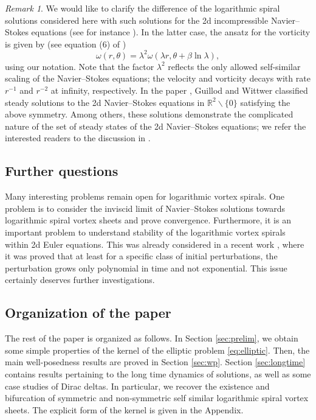 \documentclass[10pt]{article}
\theoremstyle{definition}
\theoremstyle{remark}
\newtheorem{remark}[theorem]{Remark}
\numberwithin{equation}{section}
\newcommand{\0}{\emptyset}
\newcommand{\bt}{\beta}
\newcommand{\lmb}{\lambda}
\begin{document}
\begin{remark}
    We would like to clarify the difference of the logarithmic spiral solutions considered here with such solutions for the 2d incompressible Navier--Stokes equations (see for instance \cite{GuWi,GuWi2,Sve,Hamel,Landau}). In the latter case, the ansatz for the vorticity is given by (see equation (6) of \cite{GuWi}) $$\omega(r,\theta)=\lmb^{2} \omega(\lmb r, \theta + \bt \ln \lmb), $$ using our notation. Note that the factor $\lmb^{2}$ reflects the only allowed self-similar scaling of the Navier--Stokes equations; the velocity and vorticity decays with rate $r^{-1}$ and $r^{-2}$ at infinity, respectively. In the paper \cite{GuWi}, Guillod and Wittwer classified steady solutions to the 2d Navier--Stokes equations in $\mathbb{R}^{2}\backslash \{0\}$ satisfying the above symmetry. Among others, these solutions demonstrate the complicated nature of the set of steady states of the 2d Navier--Stokes equations; we refer the interested readers to the discussion in \cite{GuWi}. 
\end{remark}


\subsection{Further questions} Many interesting problems remain open for logarithmic vortex spirals. One problem is to consider the inviscid limit of Navier--Stokes solutions towards logarithmic spiral vortex sheets and prove convergence. Furthermore, it is an important problem to understand stability of the logarithmic vortex spirals within 2d Euler equations. This was already considered in a recent work \cite{CKW24}, where it was proved that at least for a specific class of initial perturbations, the perturbation grows only polynomial in time and not exponential. This issue certainly deserves further investigations. 

	
\subsection{Organization of the paper} The rest of the paper is organized as follows. In Section \ref{sec:prelim}, we obtain some simple properties of the kernel of the elliptic problem \eqref{eq:elliptic}. Then, the main well-posedness results are proved in Section \ref{sec:wp}. Section \ref{sec:longtime} contains results pertaining to the long time dynamics of solutions, as well as some case studies of Dirac deltas. In particular, we recover the existence and bifurcation of symmetric and non-symmetric self similar logarithmic spiral vortex sheets. The explicit form of the kernel is given in the Appendix. 
	
\end{document}
